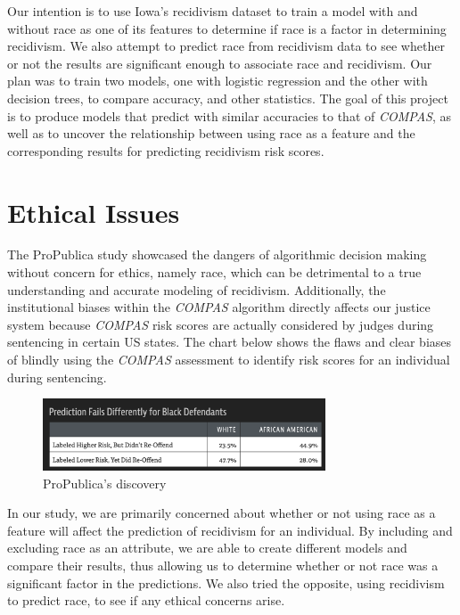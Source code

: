\documentclass[11pt, sigconf]{acmart}
\begin{document}
Our intention is to use Iowa’s recidivism dataset to train a model with and without race as one of its features to determine if race is a factor in determining recidivism. We also attempt to predict race from recidivism data to see whether or not the results are significant enough to associate race and recidivism. Our plan was to train two models, one with logistic regression and the other with decision trees, to compare accuracy, and other statistics. The goal of this project is to produce models that predict with similar accuracies to that of \emph{COMPAS}, as well as to uncover the relationship between using race as a feature and the corresponding results for predicting recidivism risk scores.

\section{Ethical Issues}

\hspace{5mm}The ProPublica study showcased the dangers of algorithmic decision making without concern for ethics, namely race, which can be detrimental to a true understanding and accurate modeling of recidivism. Additionally, the institutional biases within the \emph{COMPAS} algorithm directly affects our justice system because \emph{COMPAS} risk scores are actually considered by judges during sentencing in certain US states. The chart below shows the flaws and clear biases of blindly using the \emph{COMPAS} assessment to identify risk scores for an individual during sentencing.  
\begin{figure}[h] 	
\centering
\includegraphics[width=3.3in]{asdf.png}
\caption{ProPublica's discovery}
\end{figure}

In our study, we are primarily concerned about whether or not using race as a feature will affect the prediction of recidivism for an individual. By including and excluding race as an attribute, we are able to create different models and compare their results, thus allowing us to determine whether or not race was a significant factor in the predictions. We also tried the opposite, using recidivism to predict race, to see if any ethical concerns arise. 
\end{document}
